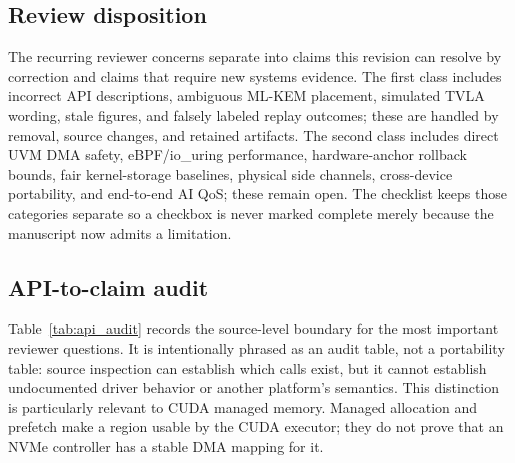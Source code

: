 \subsection{Review disposition}

The recurring reviewer concerns separate into claims this revision can resolve
by correction and claims that require new systems evidence.  The first class
includes incorrect API descriptions, ambiguous ML-KEM placement, simulated
TVLA wording, stale figures, and falsely labeled replay outcomes; these are
handled by removal, source changes, and retained artifacts.  The second class
includes direct UVM DMA safety, eBPF/io\_uring performance, hardware-anchor
rollback bounds, fair kernel-storage baselines, physical side channels,
cross-device portability, and end-to-end AI QoS; these remain open.  The
checklist keeps those categories separate so a checkbox is never marked
complete merely because the manuscript now admits a limitation.

\subsection{API-to-claim audit}

Table~\ref{tab:api_audit} records the source-level boundary for the most
important reviewer questions.  It is intentionally phrased as an audit table,
not a portability table: source inspection can establish which calls exist,
but it cannot establish undocumented driver behavior or another platform's
semantics.  This distinction is particularly relevant to CUDA managed memory.
Managed allocation and prefetch make a region usable by the CUDA executor;
they do not prove that an NVMe controller has a stable DMA mapping for it.

